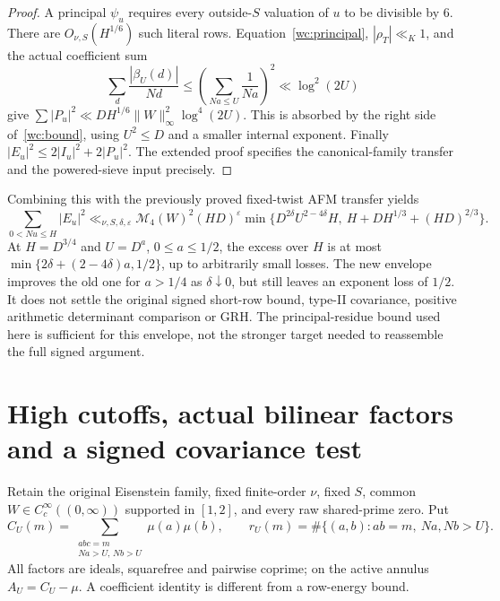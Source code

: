 \documentclass[11pt]{article}
\theoremstyle{definition}\newtheorem{definition}[theorem]{Definition}
\theoremstyle{remark}\newtheorem{remark}[theorem]{Remark}
\begin{document}
\begin{proof}
A principal $\psi_u$ requires every outside-$S$ valuation of $u$ to
be divisible by $6$. There are $O_{\nu,S}(H^{1/6})$ such literal
rows. Equation~\eqref{wc:principal}, $|\rho_T|\ll_K1$, and the actual
coefficient sum
\[
 \sum_d\frac{|\beta_U(d)|}{Nd}
 \le\left(\sum_{Na\le U}\frac1{Na}\right)^2\ll\log^2(2U)
\]
give $\sum|P_u|^2\ll DH^{1/6}\|W\|_\infty^2\log^4(2U)$.
This is absorbed by the right side of~\eqref{wc:bound}, using
$U^2\le D$ and a smaller internal exponent. Finally
$|E_u|^2\le2|I_u|^2+2|P_u|^2$. The extended proof specifies the
canonical-family transfer and the powered-sieve input precisely.
\end{proof}

Combining this with the previously proved fixed-twist AFM transfer yields
\begin{equation}\label{wc:minimum}
 \sum_{0<Nu\le H}|E_u|^2\ll_{\nu,S,\delta,\varepsilon}
 \mathcal M_4(W)^2(HD)^\varepsilon
 \min\{D^{2\delta}U^{2-4\delta}H,\ H+DH^{1/3}+(HD)^{2/3}\}.
\end{equation}
At $H=D^{3/4}$ and $U=D^a$, $0\le a\le1/2$, the excess over $H$
is at most $\min\{2\delta+(2-4\delta)a,1/2\}$, up to arbitrarily
small losses. The new envelope improves the old one for $a>1/4$ as
$\delta\downarrow0$, but still leaves an exponent loss of $1/2$.
It does not settle the original signed short-row bound, type-II covariance,
positive arithmetic determinant comparison or GRH. The principal-residue
bound used here is sufficient for this envelope, not the stronger target
needed to reassemble the full signed argument.

\section{High cutoffs, actual bilinear factors and a signed covariance test}\label{sb:core}
Retain the original Eisenstein family, fixed finite-order $\nu$, fixed $S$,
common $W\in C_c^\infty((0,\infty))$ supported in $[1,2]$, and every raw
shared-prime zero. Put
\[
 C_U(m)=\sum_{\substack{abc=m\\Na>U,\,Nb>U}}\mu(a)\mu(b),\qquad
 r_U(m)=\#\{(a,b):ab=m,\ Na,Nb>U\}.
\]
All factors are ideals, squarefree and pairwise coprime; on the active
annulus $A_U=C_U-\mu$. A coefficient identity is different from a row-energy bound.
\end{document}
